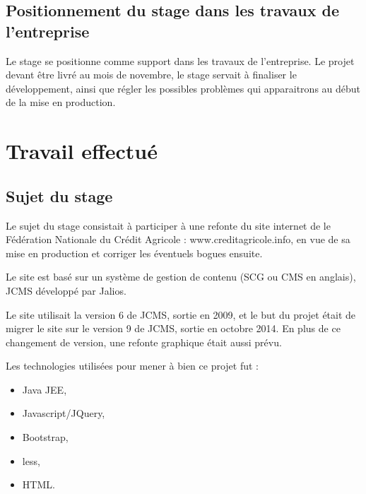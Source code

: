 \documentclass[12pt,a4paper]{article}
\begin{document}
\subsection{Positionnement du stage dans les travaux de l'entreprise}
Le stage se positionne comme support dans les travaux de l'entreprise. Le projet devant être livré au mois de novembre, le stage servait à finaliser le développement, ainsi que régler les possibles problèmes qui apparaitrons au début de la mise en production.

\newpage

\section{Travail effectué}
\subsection{Sujet du stage}
Le sujet du stage consistait à participer à une refonte du site internet de le Fédération Nationale du Crédit Agricole : www.creditagricole.info, en vue de sa mise en production et corriger les éventuels bogues ensuite.\par
Le site est basé sur un système de gestion de contenu (SCG ou CMS en anglais), JCMS développé par Jalios.\par
Le site utilisait la version 6 de JCMS, sortie en 2009, et le but du projet était de migrer le site sur le version 9 de JCMS, sortie en octobre 2014. En plus de ce changement de version, une refonte graphique était aussi prévu.\par
Les technologies utilisées pour mener à bien ce projet fut :
\begin{itemize}
\item Java JEE,
\item Javascript/JQuery,
\item Bootstrap,
\item less,
\item HTML.
\end{itemize}
\end{document}
